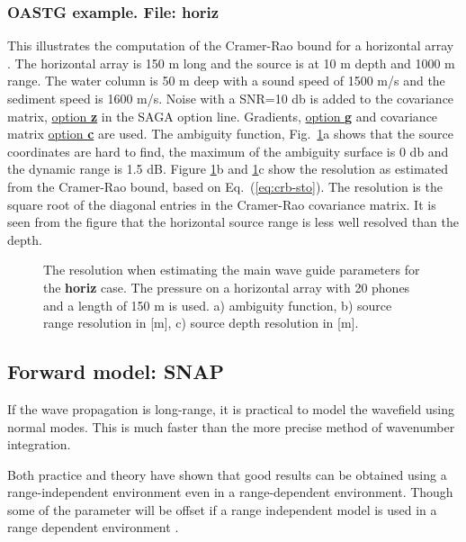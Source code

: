 \documentclass{saclantc}
\begin{document}

\subsubsection{OASTG example. File: {\bf horiz}}
\label{se:horiz}
This illustrates the computation of the Cramer-Rao bound for a horizontal
array \cite{gerstoft:ica98}. The horizontal array is 150 m long and the source is at 10 m
depth and 1000 m range. The  water column is  50 m deep with a sound
speed of 1500 m/s and the sediment speed is 1600 m/s. 
Noise  with a SNR=10 db is added to the covariance matrix,
 \underline{option {\bf z}} in the SAGA option line.
 Gradients,  \underline{option {\bf g}} and covariance matrix 
\underline{option {\bf c}} are used.
The ambiguity function, Fig.\ \ref{fig:horiz}a shows that the source 
coordinates are hard to
find, the maximum of the ambiguity surface is 0 db and the dynamic
range is 1.5 dB.
Figure \ref{fig:horiz}b and \ref{fig:horiz}c show
 the resolution as estimated from the Cramer-Rao
bound, based on Eq.~(\ref{eq:crb-sto}). The resolution is the square
root of the diagonal entries in the Cramer-Rao covariance matrix.
It is seen from the figure that the horizontal source range is less
well  resolved than the depth.



\begin{figure}
\epsfxsize=12cm
\centerline{}
\caption{ The resolution when estimating the main wave guide
parameters for the {\bf horiz} case.
The pressure on a   horizontal array with 20 phones and a length of 150
m  is used.
a) ambiguity function,
b) source range resolution in [m],
c) source depth resolution in [m].
}
\label{fig:horiz}
\end{figure}


\subsection{Forward model: SNAP}

If the wave propagation is long-range, it is practical to model the
wavefield using normal modes. This is much faster than the more precise
method of wavenumber integration.

Both practice and theory have shown that good results can be obtained using a range-independent environment even in a range-dependent environment. 
Though some of the parameter will be offset if a range independent model is used in a range dependent environment \cite{gerstoft:asa96}.
\end{document}
